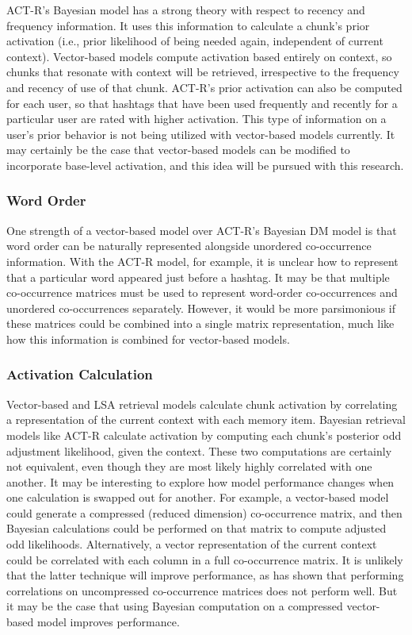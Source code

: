 \documentclass[man,floatsintext,donotrepeattitle]{apa6}
\begin{document}
ACT-R's Bayesian model has a strong theory with respect to recency and frequency information.
It uses this information to calculate a chunk's prior activation (i.e., prior likelihood of being needed again, independent of current context).
Vector-based models compute activation based entirely on context, so chunks that resonate with context will be retrieved, irrespective to the frequency and recency of use of that chunk.
ACT-R's prior activation can also be computed for each user, so that hashtags that have been used frequently and recently for a particular user are rated with higher activation.
This type of information on a user's prior behavior is not being utilized with vector-based models currently.
It may certainly be the case that vector-based models can be modified to incorporate base-level activation, and this idea will be pursued with this research.

\subsubsection{Word Order}

One strength of a vector-based model over ACT-R's Bayesian DM model is that word order can be naturally represented alongside unordered co-occurrence information.
With the ACT-R model, for example, it is unclear how to represent that a particular word appeared just before a hashtag. 
It may be that multiple co-occurrence matrices must be used to represent word-order co-occurrences and unordered co-occurrences separately.
However, it would be more parsimonious if these matrices could be combined into a single matrix representation, much like how this information is combined for vector-based models.

\subsubsection{Activation Calculation}

Vector-based and LSA retrieval models calculate chunk activation by correlating a representation of the current context with each memory item.
Bayesian retrieval models like ACT-R calculate activation by computing each chunk's posterior odd adjustment likelihood, given the context.
These two computations are certainly not equivalent, even though they are most likely highly correlated with one another.
It may be interesting to explore how model performance changes when one calculation is swapped out for another.
For example, a vector-based model could generate a compressed (reduced dimension) co-occurrence matrix, and then Bayesian calculations could be performed on that matrix to compute adjusted odd likelihoods.
Alternatively, a vector representation of the current context could be correlated with each column in a full co-occurrence matrix.
It is unlikely that the latter technique will improve performance, as \textcite{Landauer1997} has shown that performing correlations on uncompressed co-occurrence matrices does not perform well.
But it may be the case that using Bayesian computation on a compressed vector-based model improves performance.
\end{document}
